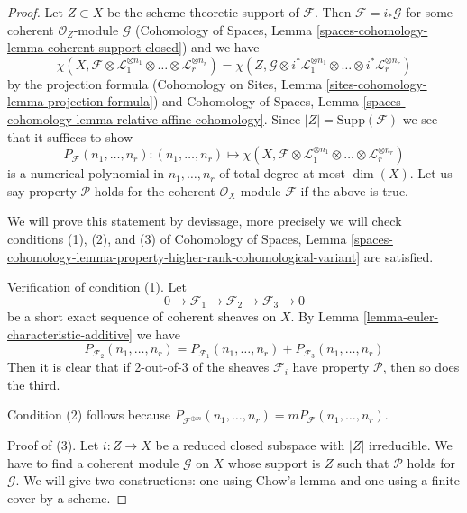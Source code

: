 \documentclass{stacks-project}
\theoremstyle{plain}
\theoremstyle{definition}
\theoremstyle{remark}
\numberwithin{equation}{subsection}
\begin{document}
\begin{proof}
Let $Z \subset X$ be the scheme theoretic support of $\mathcal{F}$.
Then $\mathcal{F} = i_*\mathcal{G}$ for some coherent
$\mathcal{O}_Z$-module $\mathcal{G}$
(Cohomology of Spaces, Lemma
\ref{spaces-cohomology-lemma-coherent-support-closed})
and we have
$$
\chi(X, \mathcal{F} \otimes
\mathcal{L}_1^{\otimes n_1} \otimes \ldots \otimes
\mathcal{L}_r^{\otimes n_r}) =
\chi(Z, \mathcal{G} \otimes
i^*\mathcal{L}_1^{\otimes n_1} \otimes \ldots \otimes
i^*\mathcal{L}_r^{\otimes n_r})
$$
by the projection formula
(Cohomology on Sites, Lemma \ref{sites-cohomology-lemma-projection-formula})
and Cohomology of Spaces, Lemma
\ref{spaces-cohomology-lemma-relative-affine-cohomology}.
Since $|Z| = \text{Supp}(\mathcal{F})$ we see that it suffices
to show
$$
P_\mathcal{F}(n_1, \ldots, n_r) :
(n_1, \ldots, n_r)
\longmapsto
\chi(X, \mathcal{F} \otimes
\mathcal{L}_1^{\otimes n_1} \otimes \ldots \otimes
\mathcal{L}_r^{\otimes n_r})
$$
is a numerical polynomial in $n_1, \ldots, n_r$ of total degree at
most $\dim(X)$. Let us say property $\mathcal{P}$ holds for the
coherent $\mathcal{O}_X$-module $\mathcal{F}$ if the above is true.

\medskip\noindent
We will prove this statement by devissage, more precisely we will
check conditions (1), (2), and (3) of
Cohomology of Spaces, Lemma
\ref{spaces-cohomology-lemma-property-higher-rank-cohomological-variant}
are satisfied.

\medskip\noindent
Verification of condition (1). Let
$$
0 \to \mathcal{F}_1 \to \mathcal{F}_2 \to \mathcal{F}_3 \to 0
$$
be a short exact sequence of coherent sheaves on $X$.
By Lemma \ref{lemma-euler-characteristic-additive} we have
$$
P_{\mathcal{F}_2}(n_1, \ldots, n_r) =
P_{\mathcal{F}_1}(n_1, \ldots, n_r) +
P_{\mathcal{F}_3}(n_1, \ldots, n_r)
$$
Then it is clear that if 2-out-of-3 of the sheaves $\mathcal{F}_i$
have property $\mathcal{P}$, then so does the third.

\medskip\noindent
Condition (2) follows because
$P_{\mathcal{F}^{\oplus m}}(n_1, \ldots, n_r) =
mP_\mathcal{F}(n_1, \ldots, n_r)$.

\medskip\noindent
Proof of (3). Let $i : Z \to X$ be a reduced closed subspace with
$|Z|$ irreducible. We have to find a coherent module $\mathcal{G}$
on $X$ whose support is $Z$ such that $\mathcal{P}$ holds for $\mathcal{G}$.
We will give two constructions: one using Chow's lemma and one
using a finite cover by a scheme.


\end{proof}
\end{document}
